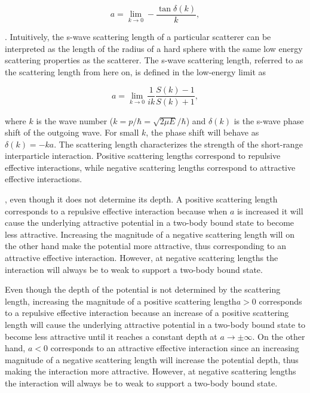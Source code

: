 \documentclass{article}
\numberwithin{equation}{section}
\begin{document}
\begin{equation} \label{eq:2}
a = \lim_{k \to 0} -\frac{\tan\delta(k)}{k},
\end{equation} 


. Intuitively, the s-wave scattering length of a particular scatterer can be interpreted as the length of the radius of a hard sphere with the same low energy scattering properties as the scatterer. The s-wave scattering length, referred to as the scattering length from here on, is defined in the low-energy limit as



\begin{equation} \label{eq:3}
a = \lim_{k \to 0} \frac{1}{ik}\frac{S(k)-1}{S(k)+1},
\end{equation}

where $k$ is the wave number ($k=p/\hbar = \sqrt{2\mu E}/\hbar$) and $\delta(k)$ is the s-wave phase shift of the outgoing wave. For small $k$, the phase shift will behave as $\delta(k)=-ka$. The scattering length characterizes the strength of the short-range interparticle interaction. Positive scattering lengths correspond to repulsive effective interactions, while negative scattering lengths correspond to attractive effective interactions.  

, even though it does not determine its depth. A positive scattering length corresponds to a repulsive effective interaction because when $a$ is increased it will cause the underlying attractive potential in a two-body bound state to become less attractive. Increasing the magnitude of a negative scattering length will on the other hand make the potential more attractive, thus corresponding to an attractive effective interaction. However, at negative scattering lengths the interaction will always be to weak to support a two-body bound state.   

Even though the depth of the potential is not determined by the scattering length, increasing the magnitude of a positive scattering length$a>0$  corresponds to a repulsive effective interaction because an increase of a positive scattering length will cause the underlying attractive potential in a two-body bound state to become less attractive until it reaches a constant depth at $a\to \pm \infty$. On the other hand, $a<0$ corresponds to an attractive effective interaction since an increasing magnitude of a negative scattering length will increase the potential depth, thus making the interaction more attractive. However, at negative scattering lengths the interaction will always be to weak to support a two-body bound state. \cite{Kajsa_my}
\end{document}
